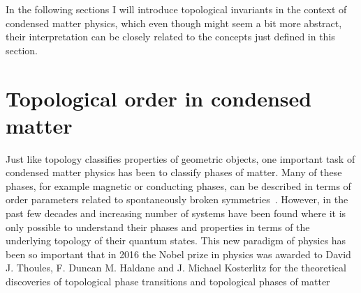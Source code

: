 In the following sections I will introduce topological invariants in the context of condensed matter physics, which even though might seem a bit more abstract, their interpretation can be closely related to the concepts just defined in this section. 
\section{Topological order in condensed matter}

Just like topology classifies properties of geometric objects, one important task of condensed matter physics has been to classify phases of matter. Many of these phases, for example magnetic or conducting phases, can be described in terms of order parameters related to spontaneously broken symmetries~\cite{landau_theory_1936}. However, in the past few decades and increasing number of systems have been found where it is only possible to understand their phases and properties in terms of the underlying topology of their quantum states. This new paradigm of physics has been so important that in 2016 the Nobel prize in physics was awarded to David J. Thoules, F. Duncan M. Haldane and J. Michael Kosterlitz for the theoretical discoveries of topological phase transitions and topological phases of matter 

